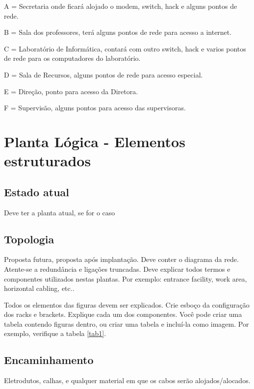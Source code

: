 \documentclass[	DIV=calc,%
							paper=a4,%
							fontsize=12pt,%
							onecolumn]{scrartcl}	 					%
\begin{document}
A = Secretaria onde ficará alojado o modem, switch, hack e alguns pontos de rede.

B = Sala dos professores, terá alguns pontos de rede para acesso a internet.

C = Laboratório de Informática, contará com outro switch, hack e varios pontos de rede para os computadores do laboratório.

D = Sala de Recursos, alguns pontos de rede para acesso especial.

E = Direção, ponto para acesso da Diretora.

F = Supervisão, alguns pontos para acesso das supervisoras.



\section{Planta Lógica - Elementos estruturados}

\subsection{Estado atual}
Deve ter a planta atual, se for o caso

\subsection{Topologia}
Proposta futura, proposta após implantação.
Deve conter o diagrama da rede. Atente-se a redundância  e ligações truncadas.
Deve explicar todos termos e componentes utilizados nestas plantas. Por exemplo: entrance facility, work area, horizontal cabling, etc..

Todos os elementos das figuras devem ser explicados. 
Crie esboço da configuração dos racks e brackets. Explique cada um dos componentes. Você pode criar uma tabela contendo figuras dentro, ou criar uma tabela e incluí-la como imagem. Por exemplo, verifique a tabela \ref{tab1}.



\subsection{Encaminhamento}
Eletrodutos, calhas, e qualquer material em que os cabos serão alojados/alocados.
\end{document}
